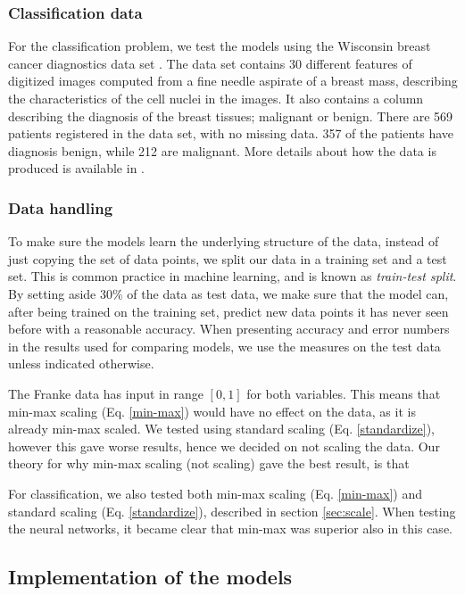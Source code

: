\subsubsection{Classification data}
For the classification problem, we test the models using the Wisconsin breast cancer diagnostics data set \cite{breast_cancer_wisconsin}.
The data set contains 30 different features of digitized images computed from a fine needle aspirate of a breast mass, describing the characteristics of the cell nuclei in the images.
It also contains a column describing the diagnosis of the breast tissues; malignant or benign.
There are 569 patients registered in the data set, with no missing data.
357 of the patients have diagnosis benign, while 212 are malignant.
More details about how the data is produced is available in \textcite{Street1993NuclearFE}.

\subsubsection{Data handling}
To make sure the models learn the underlying structure of the data, instead of just copying the set of data points, we split our data in a training set and a test set.
This is common practice in machine learning, and is known as \textit{train-test split}.
By setting aside 30\% of the data as test data, we make sure that the model can, after being trained on the training set, predict new data points it has never seen before with a reasonable accuracy.
When presenting accuracy and error numbers in the results used for comparing models, we use the measures on the test data unless indicated otherwise.

The Franke data has input in range $[0, 1]$ for both variables.
This means that min-max scaling (Eq. \ref{min-max}) would have no effect on the data, as it is already min-max scaled.
We tested using standard scaling (Eq. \ref{standardize}), however this gave worse results, hence we decided on not scaling the data.
Our theory for why min-max scaling (not scaling) gave the best result, is that 

For classification, we also tested both min-max scaling (Eq. \ref{min-max}) and standard scaling (Eq. \ref{standardize}), described in section \ref{sec:scale}.
When testing the neural networks, it became clear that min-max was superior also in this case.

\subsection{Implementation of the models}
